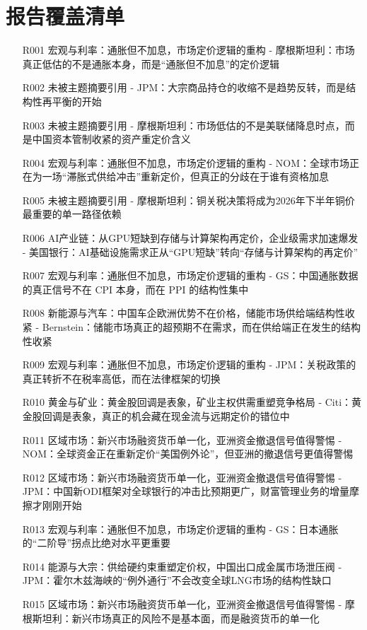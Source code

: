 \documentclass[11pt]{ctexart}
\begin{document}
\section{报告覆盖清单}
\begin{itemize}
  \item [R001] 宏观与利率：通胀但不加息，市场定价逻辑的重构 - 摩根斯坦利：市场真正低估的不是通胀本身，而是“通胀但不加息”的定价逻辑
  \item [R002] 未被主题摘要引用 - JPM：大宗商品持仓的收缩不是趋势反转，而是结构性再平衡的开始
  \item [R003] 未被主题摘要引用 - 摩根斯坦利：市场低估的不是美联储降息时点，而是中国资本管制收紧的资产重定价含义
  \item [R004] 宏观与利率：通胀但不加息，市场定价逻辑的重构 - NOM：全球市场正在为一场“滞胀式供给冲击”重新定价，但真正的分歧在于谁有资格加息
  \item [R005] 未被主题摘要引用 - 摩根斯坦利：铜关税决策将成为2026年下半年铜价最重要的单一路径依赖
  \item [R006] AI产业链：从GPU短缺到存储与计算架构再定价，企业级需求加速爆发 - 美国银行：AI基础设施需求正从“GPU短缺”转向“存储与计算架构的再定价”
  \item [R007] 宏观与利率：通胀但不加息，市场定价逻辑的重构 - GS：中国通胀数据的真正信号不在 CPI 本身，而在 PPI 的结构性集中
  \item [R008] 新能源与汽车：中国车企欧洲优势不在价格，储能市场供给端结构性收紧 - Bernstein：储能市场真正的超预期不在需求，而在供给端正在发生的结构性收紧
  \item [R009] 宏观与利率：通胀但不加息，市场定价逻辑的重构 - JPM：关税政策的真正转折不在税率高低，而在法律框架的切换
  \item [R010] 黄金与矿业：黄金股回调是表象，矿业主权供需重塑竞争格局 - Citi：黄金股回调是表象，真正的机会藏在现金流与远期定价的错位中
  \item [R011] 区域市场：新兴市场融资货币单一化，亚洲资金撤退信号值得警惕 - NOM：全球资金正在重新定价“美国例外论”，但亚洲的撤退信号更值得警惕
  \item [R012] 区域市场：新兴市场融资货币单一化，亚洲资金撤退信号值得警惕 - JPM：中国新ODI框架对全球银行的冲击比预期更广，财富管理业务的增量摩擦才刚刚开始
  \item [R013] 宏观与利率：通胀但不加息，市场定价逻辑的重构 - GS：日本通胀的“二阶导”拐点比绝对水平更重要
  \item [R014] 能源与大宗：供给硬约束重塑定价权，中国出口成金属市场泄压阀 - JPM：霍尔木兹海峡的“例外通行”不会改变全球LNG市场的结构性缺口
  \item [R015] 区域市场：新兴市场融资货币单一化，亚洲资金撤退信号值得警惕 - 摩根斯坦利：新兴市场真正的风险不是基本面，而是融资货币的单一化

\end{itemize}
\end{document}
